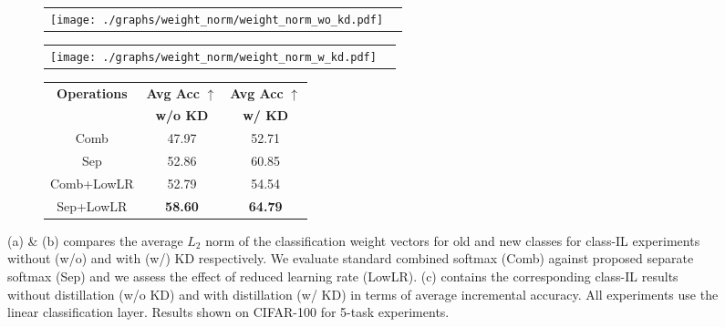 \documentclass[final]{cvpr}
\begin{document}
\begin{figure*}[!t]
\centering
\begin{subfigure}[b]{.3\textwidth}
 \begin{tabular}{cc}
\centering
\texttt{[image: ./graphs/weight\_norm/weight\_norm\_wo\_kd.pdf]} 
\end{tabular}
  \caption{}
  \label{fig:weight_norm_wo_kd}
\end{subfigure}\begin{subfigure}[b]{.3\textwidth}
 \begin{tabular}{cc}
\centering
\texttt{[image: ./graphs/weight\_norm/weight\_norm\_w\_kd.pdf]} 
\end{tabular}
  \caption{}
  \label{fig:weight_norm_w_kd}
\end{subfigure}\begin{subfigure}[b]{.35\textwidth}
 \begin{tabular}{|c|c|c|} 
 \hline
 \multirow{2}{*}{\textbf{Operations}}   & \textbf{Avg Acc} $\uparrow$  & \textbf{Avg Acc} $\uparrow$ \\ [0.5ex] 
 & \textbf{w/o KD} & \textbf{w/ KD}\\
 \hline
 \hline

    Comb                        & {47.97}           & 52.71 \\ 
    \hline
    Sep                         & {52.86}           & 60.85 \\
      \hline
   Comb+LowLR                   & 52.79             & 54.54        \\
      \hline
    Sep+LowLR                   & \textbf{58.60}     & \textbf{64.79}        \\
    \hline
    \end{tabular}
    \vspace{10px}
     \caption{}
    \label{tab:weight_norm}
\end{subfigure}
\caption{ (a) \& (b) compares the average $L_2$ norm of the classification weight vectors for old and new classes for class-IL experiments without (w/o) and with (w/) KD respectively. We evaluate standard combined softmax (Comb) against proposed separate softmax (Sep) and we assess the effect of reduced learning rate (LowLR). (c) contains the corresponding class-IL results without distillation (w/o KD) and with distillation (w/ KD) in terms of average incremental accuracy. All experiments use the linear classification layer. Results shown on CIFAR-100 for 5-task experiments. } \label{fig:weight_norm_fig_tab}
\end{figure*}
\end{document}
